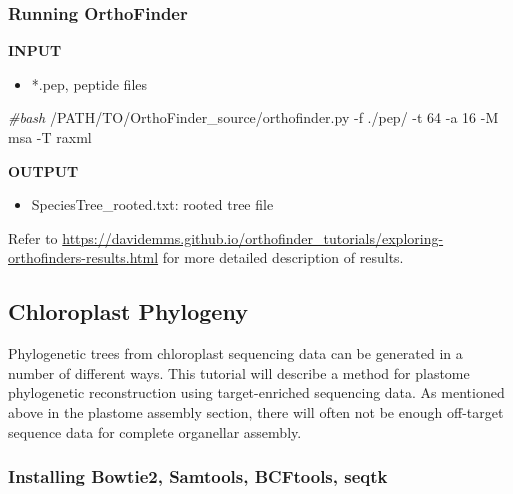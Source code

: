 \documentclass[
  12pt,
]{article}
\newenvironment{Shaded}{\begin{snugshade}}{\end{snugshade}}
\newcommand{\AttributeTok}[1]{\textcolor[rgb]{0.13,0.29,0.53}{#1}}
\newcommand{\CommentTok}[1]{\textcolor[rgb]{0.56,0.35,0.01}{\textit{#1}}}
\newcommand{\ExtensionTok}[1]{#1}
\newcommand{\NormalTok}[1]{#1}
\providecommand{\tightlist}{%
  \setlength{\itemsep}{0pt}\setlength{\parskip}{0pt}}
\begin{document}
\hypertarget{running-orthofinder}{%
\subsubsection{Running OrthoFinder}\label{running-orthofinder}}

\textbf{INPUT}

\begin{itemize}
\tightlist
\item
  *.pep, peptide files
\end{itemize}

\begin{Shaded}
\begin{Highlighting}[]
\CommentTok{\#bash}
\ExtensionTok{/PATH/TO/OrthoFinder\_source/orthofinder.py} \AttributeTok{{-}f}\NormalTok{ ./pep/ }\AttributeTok{{-}t}\NormalTok{ 64 }\AttributeTok{{-}a}\NormalTok{ 16 }\AttributeTok{{-}M}\NormalTok{ msa }\AttributeTok{{-}T}\NormalTok{ raxml}
\end{Highlighting}
\end{Shaded}

\textbf{OUTPUT}

\begin{itemize}
\tightlist
\item
  SpeciesTree\_rooted.txt: rooted tree file
\end{itemize}

Refer to \url{https://davidemms.github.io/orthofinder_tutorials/exploring-orthofinders-results.html} for more detailed description of results.

\hypertarget{chloroplast-phylogeny}{%
\subsection{Chloroplast Phylogeny}\label{chloroplast-phylogeny}}

Phylogenetic trees from chloroplast sequencing data can be generated in a number of different ways. This tutorial will describe a method for plastome phylogenetic reconstruction using target-enriched sequencing data. As mentioned above in the plastome assembly section, there will often not be enough off-target sequence data for complete organellar assembly.

\hypertarget{installing-bowtie2-samtools-bcftools-seqtk}{%
\subsubsection{Installing Bowtie2, Samtools, BCFtools, seqtk}\label{installing-bowtie2-samtools-bcftools-seqtk}}
\end{document}
